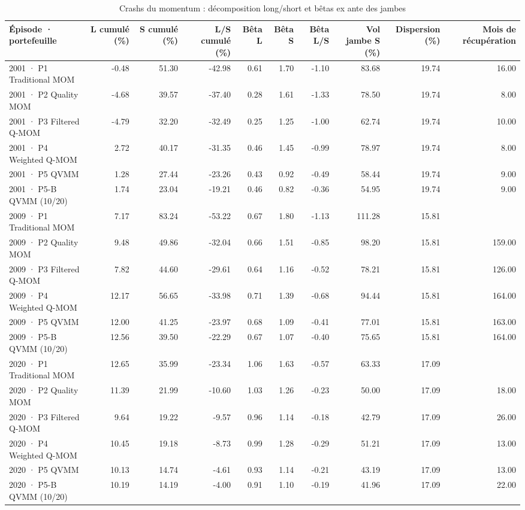 \begin{table}[htbp]
\centering
\small
\caption{Crashs du momentum : décomposition long/short et bêtas ex ante des jambes}
\label{tab:T10_crashs}
\begin{tabular}{lrrrrrrrrr}
\toprule
Épisode · portefeuille & L cumulé (\%) & S cumulé (\%) & L/S cumulé (\%) & Bêta L & Bêta S & Bêta L/S & Vol jambe S (\%) & Dispersion (\%) & Mois de récupération \\
\midrule
2001 · P1 Traditional MOM & -0.48 & 51.30 & -42.98 & 0.61 & 1.70 & -1.10 & 83.68 & 19.74 & 16.00 \\
2001 · P2 Quality MOM & -4.68 & 39.57 & -37.40 & 0.28 & 1.61 & -1.33 & 78.50 & 19.74 & 8.00 \\
2001 · P3 Filtered Q-MOM & -4.79 & 32.20 & -32.49 & 0.25 & 1.25 & -1.00 & 62.74 & 19.74 & 10.00 \\
2001 · P4 Weighted Q-MOM & 2.72 & 40.17 & -31.35 & 0.46 & 1.45 & -0.99 & 78.97 & 19.74 & 8.00 \\
2001 · P5 QVMM & 1.28 & 27.44 & -23.26 & 0.43 & 0.92 & -0.49 & 58.44 & 19.74 & 9.00 \\
2001 · P5-B QVMM (10/20) & 1.74 & 23.04 & -19.21 & 0.46 & 0.82 & -0.36 & 54.95 & 19.74 & 9.00 \\
2009 · P1 Traditional MOM & 7.17 & 83.24 & -53.22 & 0.67 & 1.80 & -1.13 & 111.28 & 15.81 &  \\
2009 · P2 Quality MOM & 9.48 & 49.86 & -32.04 & 0.66 & 1.51 & -0.85 & 98.20 & 15.81 & 159.00 \\
2009 · P3 Filtered Q-MOM & 7.82 & 44.60 & -29.61 & 0.64 & 1.16 & -0.52 & 78.21 & 15.81 & 126.00 \\
2009 · P4 Weighted Q-MOM & 12.17 & 56.65 & -33.98 & 0.71 & 1.39 & -0.68 & 94.44 & 15.81 & 164.00 \\
2009 · P5 QVMM & 12.00 & 41.25 & -23.97 & 0.68 & 1.09 & -0.41 & 77.01 & 15.81 & 163.00 \\
2009 · P5-B QVMM (10/20) & 12.56 & 39.50 & -22.29 & 0.67 & 1.07 & -0.40 & 75.65 & 15.81 & 164.00 \\
2020 · P1 Traditional MOM & 12.65 & 35.99 & -23.34 & 1.06 & 1.63 & -0.57 & 63.33 & 17.09 &  \\
2020 · P2 Quality MOM & 11.39 & 21.99 & -10.60 & 1.03 & 1.26 & -0.23 & 50.00 & 17.09 & 18.00 \\
2020 · P3 Filtered Q-MOM & 9.64 & 19.22 & -9.57 & 0.96 & 1.14 & -0.18 & 42.79 & 17.09 & 26.00 \\
2020 · P4 Weighted Q-MOM & 10.45 & 19.18 & -8.73 & 0.99 & 1.28 & -0.29 & 51.21 & 17.09 & 13.00 \\
2020 · P5 QVMM & 10.13 & 14.74 & -4.61 & 0.93 & 1.14 & -0.21 & 43.19 & 17.09 & 13.00 \\
2020 · P5-B QVMM (10/20) & 10.19 & 14.19 & -4.00 & 0.91 & 1.10 & -0.19 & 41.96 & 17.09 & 22.00 \\
\bottomrule
\end{tabular}
\end{table}